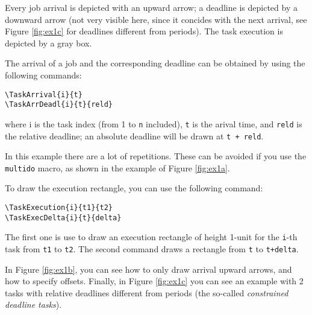 \documentclass{article}
\begin{document}
Every job arrival is depicted with an upward arrow; a deadline is
depicted by a downward arrow (not very visible here, since it concides
with the next arrival, see Figure \ref{fig:ex1c} for deadlines
different from periods). The task execution is depicted by a gray box.

The arrival of a job and the corresponding deadline can be obtained by
using the following commands:
\begin{verbatim}
\TaskArrival{i}{t}
\TaskArrDeadl{i}{t}{reld}
\end{verbatim}
\noindent where i is the task index (from 1 to \texttt{n} included),
\texttt{t} is the arival time, and \texttt{reld} is the relative
deadline; an absolute deadline will be drawn at \texttt{t + reld}.

In this example there are a lot of repetitions. These can be avoided
if you use the \texttt{multido} macro, as shown in the example of
Figure \ref{fig:ex1a}.

To draw the execution rectangle, you can use the following command:
\begin{verbatim}
\TaskExecution{i}{t1}{t2}
\TaskExecDelta{i}{t}{delta}
\end{verbatim}
The first one is use to draw an execution rectangle of height 1-unit
for the \texttt{i}-th task from \texttt{t1} to \texttt{t2}. The second
command draws a rectangle from \texttt{t} to \texttt{t+delta}.

In Figure \ref{fig:ex1b}, you can see how to only draw arrival upward
arrows, and how to specify offsets. Finally, in Figure \ref{fig:ex1c}
you can see an example with 2 tasks with relative deadlines different
from periods (the so-called \emph{constrained deadline tasks}).
\end{document}
